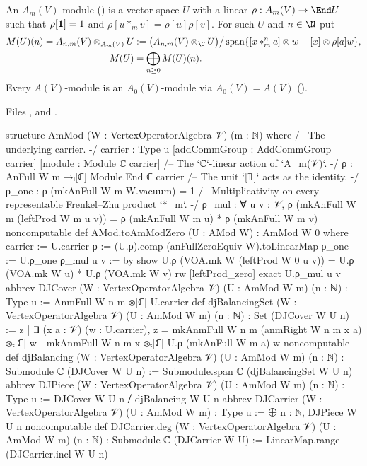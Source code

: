 \begin{definition}\label{l13:def:djcarrier}
An $A_m(V)$-module () is a vector space $U$ with a linear $\rho:A_m(V)\to\End U$ such that
$\rho[\mathbf{1}] = 1$ and $\rho[u*_mv] = \rho[u]\rho[v]$. For such $U$ and $n\in\N$ put
\begin{align*}
 M(U)(n) = A_{n,m}(V)\otimes_{A_m(V)}U &:= \bigl(A_{n,m}(V)\otimes_\C U\bigr)\big/
 \operatorname{span}\{[x*^n_ma]\otimes w - [x]\otimes\rho[a]w\},\\
 M(U) &= \bigoplus_{n\ge0}M(U)(n).
\end{align*}
Every $A(V)$-module is an $A_0(V)$-module via $A_0(V) = A(V)$ ().
\end{definition}
\noindent Files ,
 and
.
\begin{leancode}
structure AmMod (W : VertexOperatorAlgebra 𝒱) (m : ℕ) where
  /-- The underlying carrier. -/
  carrier : Type u
  [addCommGroup : AddCommGroup carrier]
  [module : Module ℂ carrier]
  /-- The `ℂ`-linear action of `A_m(𝒱)`. -/
  ρ : AnFull W m →ₗ[ℂ] Module.End ℂ carrier
  /-- The unit `[𝟙]` acts as the identity. -/
  ρ_one : ρ (mkAnFull W m W.vacuum) = 1
  /-- Multiplicativity on every representable Frenkel–Zhu product `*_m`. -/
  ρ_mul : ∀ u v : 𝒱,
    ρ (mkAnFull W m (leftProd W m u v)) = ρ (mkAnFull W m u) * ρ (mkAnFull W m v)
noncomputable def AMod.toAmModZero (U : AMod W) : AmMod W 0 where
  carrier := U.carrier
  ρ := (U.ρ).comp (anFullZeroEquiv W).toLinearMap
  ρ_one := U.ρ_one
  ρ_mul u v := by
    show U.ρ (VOA.mk W (leftProd W 0 u v))
      = U.ρ (VOA.mk W u) * U.ρ (VOA.mk W v)
    rw [leftProd_zero]
    exact U.ρ_mul u v
abbrev DJCover (W : VertexOperatorAlgebra 𝒱) (U : AmMod W m) (n : ℕ) : Type u :=
  AnmFull W n m ⊗[ℂ] U.carrier
def djBalancingSet (W : VertexOperatorAlgebra 𝒱) (U : AmMod W m) (n : ℕ) :
    Set (DJCover W U n) :=
  {z | ∃ (x a : 𝒱) (w : U.carrier),
    z = mkAnmFull W n m (anmRight W n m x a) ⊗ₜ[ℂ] w
        - mkAnmFull W n m x ⊗ₜ[ℂ] U.ρ (mkAnFull W m a) w}
noncomputable def djBalancing (W : VertexOperatorAlgebra 𝒱) (U : AmMod W m) (n : ℕ) :
    Submodule ℂ (DJCover W U n) :=
  Submodule.span ℂ (djBalancingSet W U n)
abbrev DJPiece (W : VertexOperatorAlgebra 𝒱) (U : AmMod W m) (n : ℕ) : Type u :=
  DJCover W U n ⧸ djBalancing W U n
abbrev DJCarrier (W : VertexOperatorAlgebra 𝒱) (U : AmMod W m) : Type u :=
  ⨁ n : ℕ, DJPiece W U n
noncomputable def DJCarrier.deg (W : VertexOperatorAlgebra 𝒱) (U : AmMod W m) (n : ℕ) :
    Submodule ℂ (DJCarrier W U) := LinearMap.range (DJCarrier.incl W U n)
\end{leancode}

